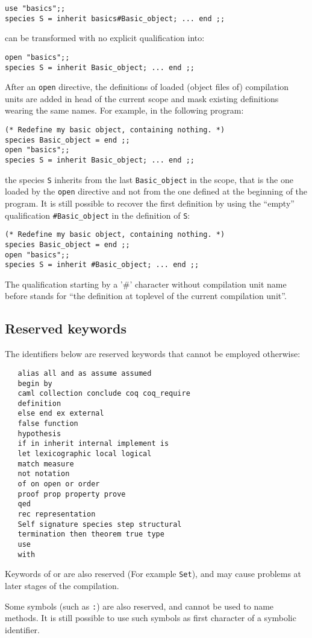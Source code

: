 {\scriptsize
\begin{lstlisting}
use "basics";;
species S = inherit basics#Basic_object; ... end ;;
\end{lstlisting}
}
can be transformed with no explicit qualification into:
{\scriptsize
\begin{lstlisting}
open "basics";;
species S = inherit Basic_object; ... end ;;
\end{lstlisting}
}

After an {\tt open} directive, the definitions of loaded (object files
of) compilation units are added in head of the current scope and mask
existing definitions wearing the same names. For example, in
the following program: {\scriptsize
\begin{lstlisting}
(* Redefine my basic object, containing nothing. *)
species Basic_object = end ;;
open "basics";;
species S = inherit Basic_object; ... end ;;
\end{lstlisting}
}
the species {\tt S} inherits from the last {\tt Basic\_object} in the
scope, that is the one loaded by the {\tt open} directive and not from
the one defined at the beginning of the program. It is still possible
to recover the first definition by using the ``empty'' qualification
{\tt \#Basic\_object} in the definition of {\tt S}:
{\scriptsize
\begin{lstlisting}
(* Redefine my basic object, containing nothing. *)
species Basic_object = end ;;
open "basics";;
species S = inherit #Basic_object; ... end ;;
\end{lstlisting}
}

The qualification starting by a '\#' character without compilation
unit name before stands for ``the definition at toplevel of the
current compilation unit''.

\subsection{Reserved keywords}
The identifiers below are reserved keywords that cannot be employed
otherwise:
\begin{verbatim}
   alias all and as assume assumed
   begin by
   caml collection conclude coq coq_require
   definition
   else end ex external
   false function
   hypothesis
   if in inherit internal implement is
   let lexicographic local logical
   match measure
   not notation
   of on open or order
   proof prop property prove
   qed
   rec representation
   Self signature species step structural
   termination then theorem true type
   use
   with
\end{verbatim}


Keywords of {\coq} or {\ocaml} are also reserved (For example {\tt Set}),
and may cause problems at later stages of the {\focal} compilation.

Some symbols (such as {\tt :}) are also reserved, and cannot be used to name methods.
It is still possible to use such symbols as first character of a symbolic identifier.
